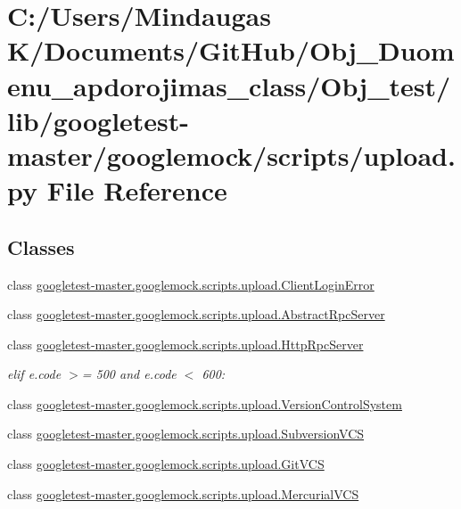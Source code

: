 \hypertarget{_obj__test_2lib_2googletest-master_2googlemock_2scripts_2upload_8py}{}\section{C\+:/\+Users/\+Mindaugas K/\+Documents/\+Git\+Hub/\+Obj\+\_\+\+Duomenu\+\_\+apdorojimas\+\_\+class/\+Obj\+\_\+test/lib/googletest-\/master/googlemock/scripts/upload.py File Reference}
\label{_obj__test_2lib_2googletest-master_2googlemock_2scripts_2upload_8py}
\subsection*{Classes}
\begin{DoxyCompactItemize}
\item 
class \mbox{\hyperlink{classgoogletest-master_1_1googlemock_1_1scripts_1_1upload_1_1_client_login_error}{googletest-\/master.\+googlemock.\+scripts.\+upload.\+Client\+Login\+Error}}
\item 
class \mbox{\hyperlink{classgoogletest-master_1_1googlemock_1_1scripts_1_1upload_1_1_abstract_rpc_server}{googletest-\/master.\+googlemock.\+scripts.\+upload.\+Abstract\+Rpc\+Server}}
\item 
class \mbox{\hyperlink{classgoogletest-master_1_1googlemock_1_1scripts_1_1upload_1_1_http_rpc_server}{googletest-\/master.\+googlemock.\+scripts.\+upload.\+Http\+Rpc\+Server}}
\begin{DoxyCompactList}\small\item\em elif e.\+code $>$= 500 and e.\+code $<$ 600\+: \end{DoxyCompactList}\item 
class \mbox{\hyperlink{classgoogletest-master_1_1googlemock_1_1scripts_1_1upload_1_1_version_control_system}{googletest-\/master.\+googlemock.\+scripts.\+upload.\+Version\+Control\+System}}
\item 
class \mbox{\hyperlink{classgoogletest-master_1_1googlemock_1_1scripts_1_1upload_1_1_subversion_v_c_s}{googletest-\/master.\+googlemock.\+scripts.\+upload.\+Subversion\+V\+CS}}
\item 
class \mbox{\hyperlink{classgoogletest-master_1_1googlemock_1_1scripts_1_1upload_1_1_git_v_c_s}{googletest-\/master.\+googlemock.\+scripts.\+upload.\+Git\+V\+CS}}
\item 
class \mbox{\hyperlink{classgoogletest-master_1_1googlemock_1_1scripts_1_1upload_1_1_mercurial_v_c_s}{googletest-\/master.\+googlemock.\+scripts.\+upload.\+Mercurial\+V\+CS}}
\end{DoxyCompactItemize}
